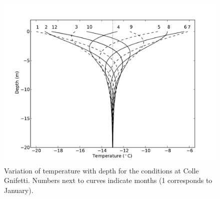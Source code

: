 \documentclass[parskip=half]{scrartcl}
\begin{document}
\begin{figure}[htbp]
 \centering
 \includegraphics[height=10.cm]{figures/temp-variation}  
 \caption{Variation of temperature with depth for the conditions at Colle
   Gnifetti.  Numbers next to curves indicate months (1 corresponds to January). }
 \label{fig:water}
\end{figure}
\end{document}

